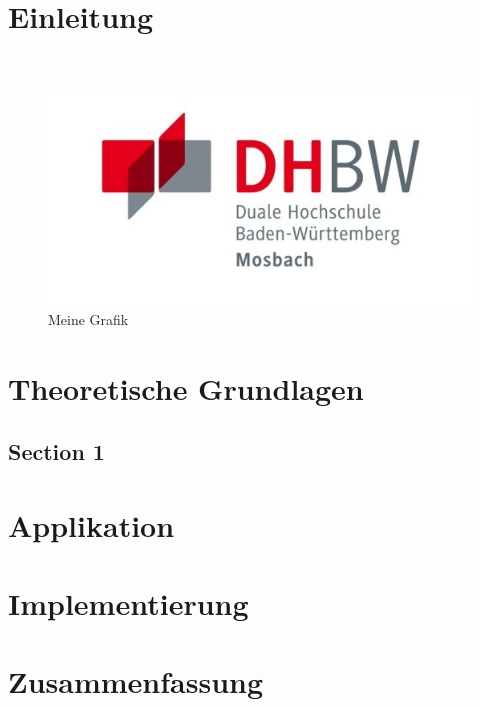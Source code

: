 \chapter{Einleitung} 
    \autocite[vgl.][S.245]{01} \\
    \begin{figure}[h]
        \centering
        \includegraphics{images/dhbw-logo.jpg}
        \caption{Meine Grafik}
        \label{fig:meine-grafik}
    \end{figure}
       

\chapter{Theoretische Grundlagen}

    \section{Section 1} 


\chapter{Applikation}


\chapter{Implementierung}


\chapter{Zusammenfassung} %

